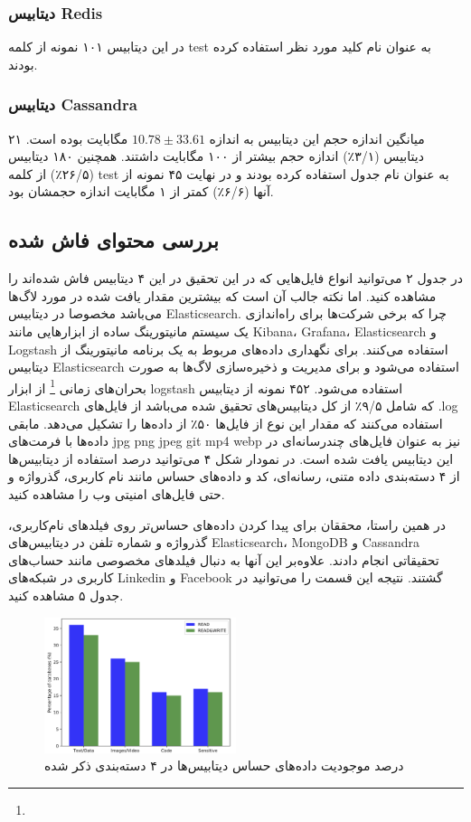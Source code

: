 \documentclass[10pt, a4paper]{article}
\begin{document}
\subsubsection{دیتابیس Redis}

در این دیتابیس ۱۰۱ نمونه از کلمه test به عنوان نام کلید مورد نظر استفاده کرده
بودند.

\subsubsection{دیتابیس Cassandra}

میانگین اندازه حجم این دیتابیس به اندازه $ 10.78 \pm 33.61 $ مگابایت بوده است.
۲۱ دیتابیس (۳/۱٪) اندازه حجم بیشتر از ۱۰۰ مگابایت داشتند. همچنین ۱۸۰ دیتابیس
(۲۶/۵٪) از کلمه test به عنوان نام جدول استفاده کرده بودند و در نهایت ۴۵ نمونه از
آنها (۶/۶٪) کمتر از ۱ مگابایت اندازه حجمشان بود. 

\subsection{بررسی محتوای فاش شده}

در جدول ۲ می‌توانید انواع فایل‌هایی که در این تحقیق در این ۴ دیتابیس فاش شده‌اند
را مشاهده کنید. اما نکته جالب آن است که بیشترین مقدار یافت شده در مورد لاگ‌ها
می‌باشد مخصوصا در دیتابیس Elasticsearch. چرا که برخی شرکت‌ها برای راه‌اندازی یک
سیستم مانیتورینگ ساده از ابزار‌هایی مانند Kibana، Grafana، Elasticsearch و
Logstash استفاده می‌کنند. برای نگهداری داده‌های مربوط به یک برنامه مانیتورینگ از
دیتابیس Elasticsearch استفاده می‌شود و برای مدیریت و ذخیره‌سازی لاگ‌ها به صورت
بحران‌های زمانی \footnote{} از ابزار logstash استفاده
می‌شود. ۴۵۲ نمونه از دیتابیس Elasticsearch که شامل ۹/۵٪ از کل دیتابیس‌های تحقیق
شده می‌باشد از فایل‌های .log استفاده می‌کنند که مقدار این نوع از فایل‌ها ۵۰٪ از
داده‌ها را تشکیل می‌دهد. مابقی داده‌ها با فرمت‌های jpg png jpeg git mp4 webp نیز
به عنوان فایل‌های چندرسانه‌ای در این دیتابیس یافت شده است. در نمودار شکل ۴
می‌توانید درصد استفاده از دیتابیس‌ها از ۴ دسته‌بندی داده متنی، رسانه‌ای، کد و
داده‌های حساس مانند نام کاربری، گذرواژه و حتی فایل‌های امنیتی وب را مشاهده کنید.

در همین راستا، محققان برای پیدا کردن داده‌های حساس‌تر روی فیلد‌های نام‌کاربری،
گذرواژه و شماره تلفن در دیتابیس‌های Elasticsearch، MongoDB و Cassandra تحقیقاتی
انجام دادند. علاوه‌بر این آنها به دنبال فیلد‌های مخصوصی مانند حساب‌های کاربری در
شبکه‌های Linkedin و Facebook گشتند. نتیجه این قسمت را می‌توانید در جدول ۵ مشاهده
کنید. 

\begin{figure}
    \centering
    \includegraphics[width=0.5\textwidth]{res/fig4.png}
    \caption{درصد موجودیت داده‌های حساس دیتابیس‌ها در ۴ دسته‌بندی ذکر شده}
    \label{fig: diagram}
\end{figure}
\end{document}
